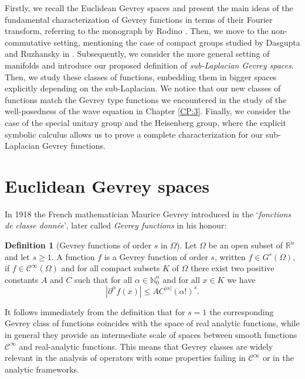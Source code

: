 \documentclass[12pt,oneside,a4paper]{book}
\numberwithin{equation}{section}     %
\theoremstyle{plain}
\theoremstyle{definition}
\newtheorem{definition}[theorem]{Definition}
\newcommand{\N}{{\mathbb N}}
\newcommand{\R}{{\mathbb R}}
\newcommand{\Rn}{{\R}^n}
\begin{document}
Firstly, we recall the Euclidean Gevrey spaces and present the main ideas of the fundamental characterization of Gevrey functions in terms of their Fourier transform, referring to the monograph by Rodino \cite{R1993}. Then, we move to the non-commutative setting, mentioning the case of compact groups studied by Dasgupta and Ruzhansky in \cite{DR2014}. Subsequently, we consider the more general setting of manifolds and introduce our proposed definition of \textit{sub-Laplacian Gevrey spaces}. Then, we study these classes of functions, embedding them in bigger spaces explicitly depending on the sub-Laplacian. We notice that our new classes of functions match the Gevrey type functions we encountered in the study of the well-posedness of the wave equation in Chapter \ref{CP:3}. Finally, we consider the case of the special unitary group and the Heisenberg group, where the explicit symbolic calculus allows us to prove a complete characterization for our sub-Laplacian Gevrey functions.  


\section{Euclidean Gevrey spaces}
In 1918 the French mathematician Maurice Gevrey introduced in \cite{G1918} the `\textit{fonctions de classe donn\'ee}', later called \textit{Gevrey functions} in his honour:
\begin{definition}[Gevrey functions of order $s$ in $\Omega$]
	Let $\Omega$ be an open subset of $\Rn$ and let $s\geq 1$. A function $f$ is a Gevrey function of order $s$, written $f\in G^s(\Omega)$, if $f\in\mathcal{C}^\infty(\Omega)$ and for all compact subsets $K$ of $\Omega$ there exist two positive constants $A$ and $C$ such that for all $\alpha\in\N^n_0$ and for all $x\in K$ we have
	\[
	|\partial^\alpha f(x)|\leq A C^{|\alpha|}(\alpha!)^s.
	\]
\end{definition}

It follows immediately from the definition that for $s=1$ the corresponding Gevrey class of functions coincides with the space of real analytic functions, while in general they provide an intermediate scale of spaces between smooth functions $\mathcal{C}^\infty$ and real-analytic functions. This means that Gevrey classes are widely relevant in the analysis of operators with  some properties failing in $\mathcal{C}^\infty$ or in the analytic frameworks.
\end{document}
